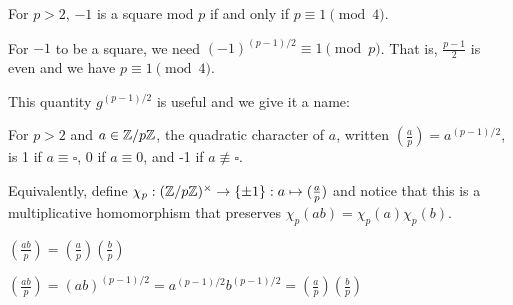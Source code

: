 \documentclass[notes]{agony}
\begin{document}
\begin{corollary}
    For $p > 2$, $-1$ is a square mod $p$ if and only if $p \equiv 1 \pmod 4$.
\end{corollary}
\begin{prf}
    For $-1$ to be a square, we need $(-1)^{(p-1)/2} \equiv 1 \pmod p$.
    That is, $\frac{p-1}{2}$ is even and we have $p \equiv 1 \pmod 4$.
\end{prf}

This quantity $g^{(p-1)/2}$ is useful and we give it a name:

\begin{defn}
    For $p > 2$ and $a \in \mathbb{Z}/p\mathbb{Z}$, the quadratic character of $a$,
    written $(\frac{a}{p}) = a^{(p-1)/2}$,
    is 1 if $a \equiv \square$, 0 if $a \equiv 0$, and -1 if $a \not\equiv \square$.

    Equivalently, define $\chi_p : (\mathbb{Z}/p\mathbb{Z})^\times \to \{\pm 1\} : a \mapsto (\frac{a}{p})$
    and notice that this is a multiplicative homomorphism that preserves $\chi_p(ab) = \chi_p(a)\chi_p(b)$.
\end{defn}

\begin{theorem}[multiplicativity]
    $(\frac{ab}{p}) = (\frac{a}{p})(\frac{b}{p})$
\end{theorem}
\begin{prf}
    $(\frac{ab}{p}) = (ab)^{(p-1)/2} = a^{(p-1)/2}b^{(p-1)/2} = (\frac{a}{p})(\frac{b}{p})$
\end{prf}
\end{document}
